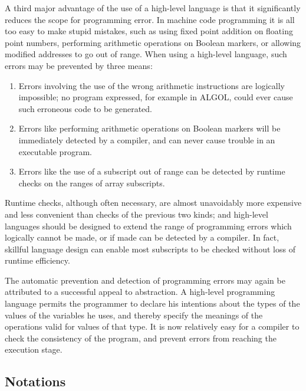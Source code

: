 A third major advantage of the use of a high-level language is that it significantly reduces the scope for programming error. In machine code programming it is all too easy to make stupid mistakes, such as using fixed point addition on floating point numbers, performing arithmetic operations on Boolean markers, or allowing modified addresses to go out of range. When using a high-level language, such errors may be prevented by three means:

\begin{enumerate}[leftmargin=2\parindent, label=(\arabic*)]
	\item Errors involving the use of the wrong arithmetic instructions are logically impossible; no program expressed, for example in ALGOL, could ever cause such erroneous code to be generated.
	\item Errors like performing arithmetic operations on Boolean markers will be immediately detected by a compiler, and can never cause trouble in an executable program.
	\item Errors like the use of a subscript out of range can be detected by runtime checks on the ranges of array subscripts.
\end{enumerate}

Runtime checks, although often necessary, are almost unavoidably more expensive and less convenient than checks of the previous two kinds; and high-level languages should be designed to extend the range of programming errors which logically cannot be made, or if made can be detected by a compiler. In fact, skillful language design can enable most subscripts to be checked without loss of runtime efficiency.

The automatic prevention and detection of programming errors may again be attributed to a successful appeal to abstraction. A high-level programming language permits the programmer to declare his intentions about the types of the values of the variables he uses, and thereby specify the meanings of the operations valid for values of that type. It is now relatively easy for a compiler to check the consistency of the program, and prevent errors from reaching the execution stage.

\subsection{Notations}

